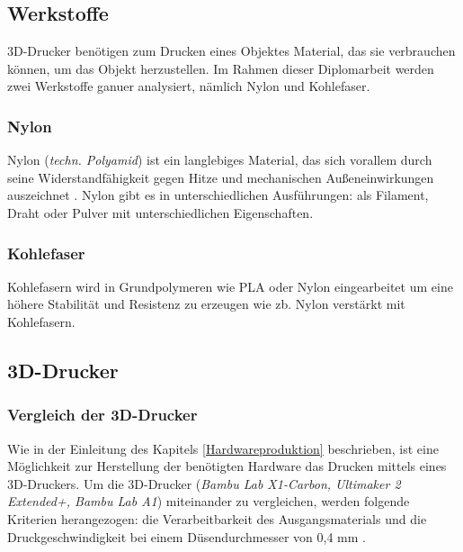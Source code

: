 \subsection{Werkstoffe}
3D-Drucker benötigen zum Drucken eines Objektes Material, das sie verbrauchen können, um das Objekt herzustellen. Im Rahmen dieser Diplomarbeit werden zwei Werkstoffe ganuer analysiert, nämlich Nylon und Kohlefaser.

\subsubsection{Nylon}
Nylon (\textit{techn. Polyamid}) ist ein langlebiges Material, das sich vorallem durch seine Widerstandfähigkeit gegen Hitze und mechanischen Außeneinwirkungen auszeichnet \parencite{Nylon}. Nylon gibt es in unterschiedlichen Ausführungen: als Filament, Draht oder Pulver mit unterschiedlichen Eigenschaften. 

\subsubsection{Kohlefaser}
Kohlefasern wird in Grundpolymeren wie PLA oder Nylon eingearbeitet \parencite{Kohlefasern} um eine höhere Stabilität und Resistenz zu erzeugen wie zb. Nylon verstärkt mit Kohlefasern.\\


\newpage
\subsection{3D-Drucker}

\subsubsection{Vergleich der 3D-Drucker}
Wie in der Einleitung des Kapitels \ref{Hardwareproduktion} beschrieben, ist eine Möglichkeit zur Herstellung der benötigten Hardware das Drucken mittels eines 3D-Druckers. Um die 3D-Drucker (\textit{Bambu Lab X1-Carbon, Ultimaker 2 Extended+, Bambu Lab A1})  \parencite{Ultimaker2ExtendedSpecification} \parencite{BambuLabA1} miteinander zu vergleichen, werden folgende Kriterien herangezogen: die Verarbeitbarkeit des Ausgangsmaterials und die Druckgeschwindigkeit bei einem Düsendurchmesser von 0,4 mm \parencite{BambuLabX1Carbon3DPrinterSpecifications}. 

